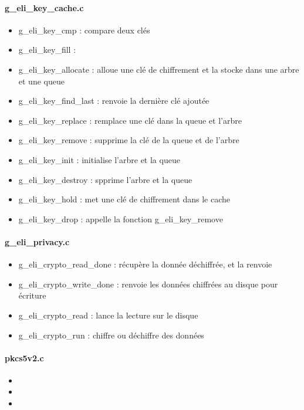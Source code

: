 \paragraph{g\_eli\_key\_cache.c}
\begin{itemize}
	\item g\_eli\_key\_cmp : compare deux clés
	\item g\_eli\_key\_fill : 
	\item g\_eli\_key\_allocate : alloue une clé de chiffrement et la 
		stocke dans une arbre et une queue
	\item g\_eli\_key\_find\_last : renvoie la dernière clé ajoutée
	\item g\_eli\_key\_replace : remplace une clé dans la queue et l'arbre
	\item g\_eli\_key\_remove : supprime la clé de la queue et de l'arbre
	\item g\_eli\_key\_init : initialise l'arbre et la queue
	\item g\_eli\_key\_destroy : spprime l'arbre et la queue
	\item g\_eli\_key\_hold : met une clé de chiffrement dans le cache
	\item g\_eli\_key\_drop : appelle la fonction g\_eli\_key\_remove
\end{itemize}

\paragraph{g\_eli\_privacy.c}
\begin{itemize}
	\item g\_eli\_crypto\_read\_done : récupère la donnée déchiffrée, et la
		renvoie
	\item g\_eli\_crypto\_write\_done : renvoie les données chiffrées 
		au disque pour écriture
	\item g\_eli\_crypto\_read : lance la lecture sur le disque
	\item g\_eli\_crypto\_run : chiffre ou déchiffre des données
\end{itemize}

\paragraph{pkcs5v2.c}
\begin{itemize}
	\item
	\item
	\item
\end{itemize}
